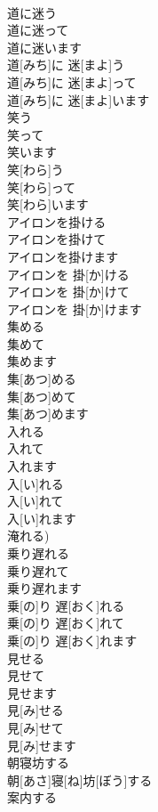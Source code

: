 \documentclass[8pt]{extreport}
\begin{document}
\begin{CJK}{UTF8}{min}
\\	道に迷う 
\\	道に迷って 
\\	道に迷います	
\\	道[みち]に 迷[まよ]う 
\\	道[みち]に 迷[まよ]って 
\\	道[みち]に 迷[まよ]います	
\\	笑う 
\\	笑って 
\\	笑います	
\\	笑[わら]う 
\\	笑[わら]って 
\\	笑[わら]います	
\\	アイロンを掛ける 
\\	アイロンを掛けて 
\\	アイロンを掛けます	
\\	アイロンを 掛[か]ける 
\\	アイロンを 掛[か]けて 
\\	アイロンを 掛[か]けます	
\\	集める 
\\	集めて 
\\	集めます	
\\	集[あつ]める 
\\	集[あつ]めて 
\\	集[あつ]めます	
\\	入れる 
\\	入れて 
\\	入れます	
\\	入[い]れる 
\\	入[い]れて 
\\	入[い]れます 
\\	淹れる)	
\\	乗り遅れる 
\\	乗り遅れて 
\\	乗り遅れます	
\\	乗[の]り 遅[おく]れる 
\\	乗[の]り 遅[おく]れて 
\\	乗[の]り 遅[おく]れます	
\\	見せる 
\\	見せて 
\\	見せます	
\\	見[み]せる 
\\	見[み]せて 
\\	見[み]せます	
\\	朝寝坊する	
\\	朝[あさ]寝[ね]坊[ぼう]する	
\\	案内する	

\end{CJK}
\end{document}

